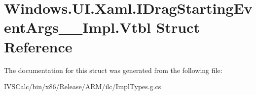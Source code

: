 \hypertarget{struct_windows_1_1_u_i_1_1_xaml_1_1_i_drag_starting_event_args_____impl_1_1_vtbl}{}\section{Windows.\+U\+I.\+Xaml.\+I\+Drag\+Starting\+Event\+Args\+\_\+\+\_\+\+Impl.\+Vtbl Struct Reference}
\label{struct_windows_1_1_u_i_1_1_xaml_1_1_i_drag_starting_event_args_____impl_1_1_vtbl}


The documentation for this struct was generated from the following file\+:\begin{DoxyCompactItemize}
\item 
I\+V\+S\+Calc/bin/x86/\+Release/\+A\+R\+M/ilc/Impl\+Types.\+g.\+cs\end{DoxyCompactItemize}
